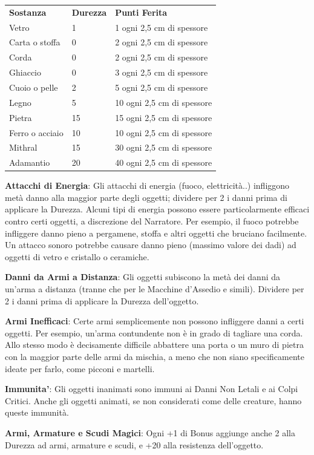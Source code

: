 \documentclass[a4paper,11pt,twoside,openany]{book}
\begin{document}
\begin{tabular}{lll}
	\toprule
	\textbf{Sostanza} & \textbf{Durezza} & \textbf{Punti Ferita} \tabularnewline
	Vetro             & 1                & 1 ogni 2,5 cm di spessore\tabularnewline
	Carta o stoffa    & 0                & 2 ogni 2,5 cm di spessore\tabularnewline
	Corda             & 0                & 2 ogni 2,5 cm di spessore\tabularnewline
	Ghiaccio          & 0                & 3 ogni 2,5 cm di spessore\tabularnewline
	Cuoio o pelle     & 2                & 5 ogni 2,5 cm di spessore\tabularnewline
	Legno             & 5                & 10 ogni 2,5 cm di spessore\tabularnewline
	Pietra            & 15               & 15 ogni 2,5 cm di spessore\tabularnewline
	Ferro o acciaio   & 10               & 10 ogni 2,5 cm di spessore\tabularnewline
	Mithral           & 15               & 30 ogni 2,5 cm di spessore\tabularnewline
	Adamantio         & 20               & 40 ogni 2,5 cm di spessore\tabularnewline
\end{tabular}

\bigskip

\textbf{Attacchi di Energia}: Gli attacchi di energia (fuoco, elettricità..) infliggono metà danno alla maggior parte degli oggetti; dividere per 2 i danni prima di applicare la Durezza. Alcuni tipi di energia possono essere particolarmente efficaci contro certi oggetti, a discrezione del Narratore.
Per esempio, il fuoco potrebbe infliggere danno pieno a pergamene, stoffa e altri oggetti che bruciano facilmente. Un attacco sonoro potrebbe causare danno pieno (massimo valore dei dadi) ad oggetti di vetro e cristallo o ceramiche.

\textbf{Danni da Armi a Distanza}: Gli oggetti subiscono la metà dei danni da un'arma a distanza (tranne che per le Macchine d'Assedio e simili). Dividere per 2 i danni prima di applicare la Durezza dell'oggetto.

\textbf{Armi Inefficaci}: Certe armi semplicemente non possono infliggere danni a certi oggetti. Per esempio, un'arma contundente non è in grado di tagliare una corda.
Allo stesso modo è decisamente difficile abbattere una porta o un muro di pietra con la maggior parte delle armi da mischia, a meno che non siano specificamente ideate per farlo, come picconi e martelli.

\textbf{Immunita'}: Gli oggetti inanimati sono immuni ai Danni Non Letali e ai Colpi Critici. Anche gli oggetti animati, se non considerati come delle creature, hanno queste immunità.

\textbf{Armi, Armature e Scudi Magici}: Ogni +1 di Bonus aggiunge anche 2 alla Durezza ad armi, armature e scudi, e +20 alla resistenza dell'oggetto.
\end{document}
